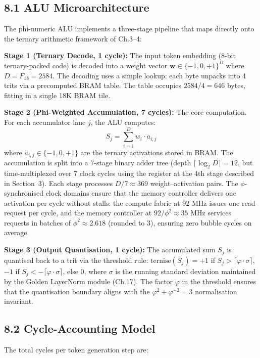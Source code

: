 \subsection{8.1 ALU Microarchitecture}

The phi-numeric ALU implements a three-stage pipeline that maps directly onto the ternary arithmetic framework of Ch.3--4:

\textbf{Stage 1 (Ternary Decode, 1 cycle):} The input token embedding (8-bit ternary-packed code) is decoded into a weight vector \(\mathbf{w} \in \{-1, 0, +1\}^D\) where \(D = F_{18} = 2584\). The decoding uses a simple lookup: each byte unpacks into 4 trits via a precomputed BRAM table. The table occupies \(2584/4 = 646\) bytes, fitting in a single 18K BRAM tile.

\textbf{Stage 2 (Phi-Weighted Accumulation, 7 cycles):} The core computation. For each accumulator lane \(j\), the ALU computes:
\[
S_j = \sum_{i=1}^{D} w_i \cdot a_{i,j}
\]
where \(a_{i,j} \in \{-1, 0, +1\}\) are the ternary activations stored in BRAM. The accumulation is split into a 7-stage binary adder tree (depth \(\lceil \log_2 D \rceil = 12\), but time-multiplexed over 7 clock cycles using the register at the 4th stage described in Section~3). Each stage processes \(D/7 \approx 369\) weight--activation pairs. The \(\phi\)-synchronised clock domains ensure that the memory controller delivers one activation per cycle without stalls: the compute fabric at 92 MHz issues one read request per cycle, and the memory controller at \(92/\phi^2 \approx 35\) MHz services requests in batches of \(\phi^2 \approx 2.618\) (rounded to 3), ensuring zero bubble cycles on average.

\textbf{Stage 3 (Output Quantisation, 1 cycle):} The accumulated sum \(S_j\) is quantised back to a trit via the threshold rule: \(\mathrm{ternise}(S_j) = +1\) if \(S_j > \lceil\varphi \cdot \sigma\rceil\), \(-1\) if \(S_j < -\lceil\varphi \cdot \sigma\rceil\), else \(0\), where \(\sigma\) is the running standard deviation maintained by the Golden LayerNorm module (Ch.17). The factor \(\varphi\) in the threshold ensures that the quantisation boundary aligns with the \(\varphi^2 + \varphi^{-2} = 3\) normalisation invariant.

\subsection{8.2 Cycle-Accounting Model}

The total cycles per token generation step are:

